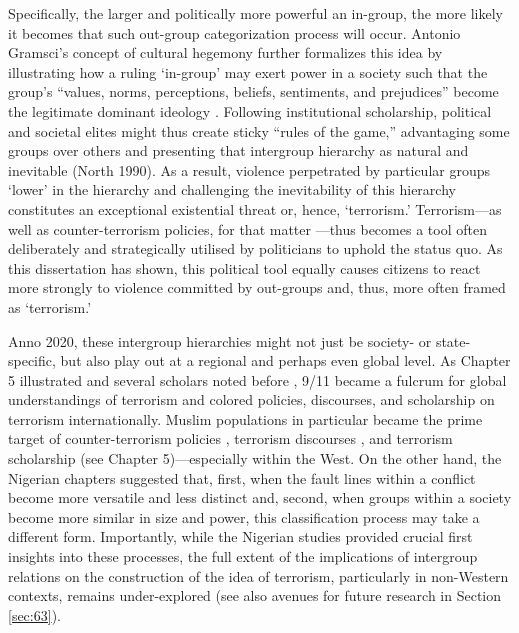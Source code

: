 Specifically, the larger and politically more powerful an in-group, the more likely it becomes that such out-group categorization process will occur. Antonio Gramsci’s concept of cultural hegemony further formalizes this idea by illustrating how a ruling `in-group' may exert power in a society such that the group's ``values, norms, perceptions, beliefs, sentiments, and prejudices'' become the legitimate dominant ideology \citep[][p.569]{Lears1985}. Following institutional scholarship, political and societal elites might thus create sticky ``rules of the game,'' advantaging some groups over others and presenting that intergroup hierarchy as natural and inevitable (North 1990). As a result, violence perpetrated by particular groups `lower' in the hierarchy and challenging the inevitability of this hierarchy constitutes an exceptional existential threat or, hence, `terrorism.'  Terrorism---as well as counter-terrorism policies, for that matter \citep[][]{Meier2019, Fadil2019}---thus becomes a tool often deliberately and strategically utilised by politicians to uphold the status quo. As this dissertation has shown, this political tool equally causes citizens to react more strongly to violence committed by out-groups and, thus, more often framed as `terrorism.' 


Anno 2020, these intergroup hierarchies might not just be society- or state-specific, but also play out at a regional and perhaps even global level. As Chapter 5 illustrated and several scholars noted before \citep{Meier2019, Fadil2019, Holland2012}, 9/11 became a fulcrum for global understandings of terrorism and colored policies, discourses, and scholarship on terrorism internationally. Muslim populations in particular became the prime target of counter-terrorism policies \citep[see, e.g.,][]{Kundnani2014}, terrorism discourses \citep[see, e.g.,][]{Kearns2019, Powell2011}, and terrorism scholarship (see Chapter 5)---especially within the West. On the other hand, the Nigerian chapters suggested that, first, when the fault lines within a conflict become more versatile and less distinct and, second, when groups within a society become more similar in size and power, this classification process may take a different form. Importantly, while the Nigerian studies provided crucial first insights into these processes, the full extent of the implications of intergroup relations on the construction of the idea of terrorism, particularly in non-Western contexts, remains under-explored (see also avenues for future research in Section \ref{sec:63}).

